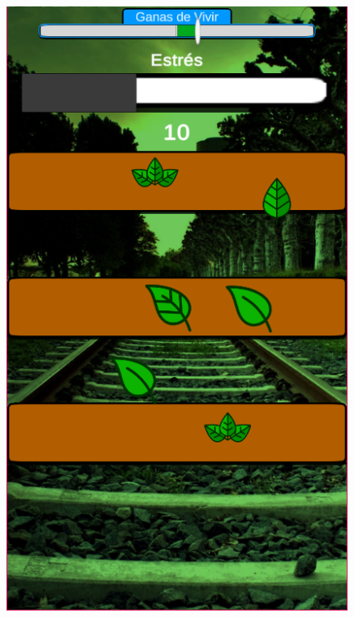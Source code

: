\documentclass[12pt]{article}
\begin{document}
\begin{figure}[h]
\begin{minipage}{.15\textwidth}
    \end{minipage}
    \begin{minipage}{.15\textwidth}
        \includegraphics[width=\textwidth]{imgs/screenshot12.png}
    \end{minipage}
    \begin{minipage}{.15\textwidth}

\end{minipage}
\end{figure}
\end{document}
